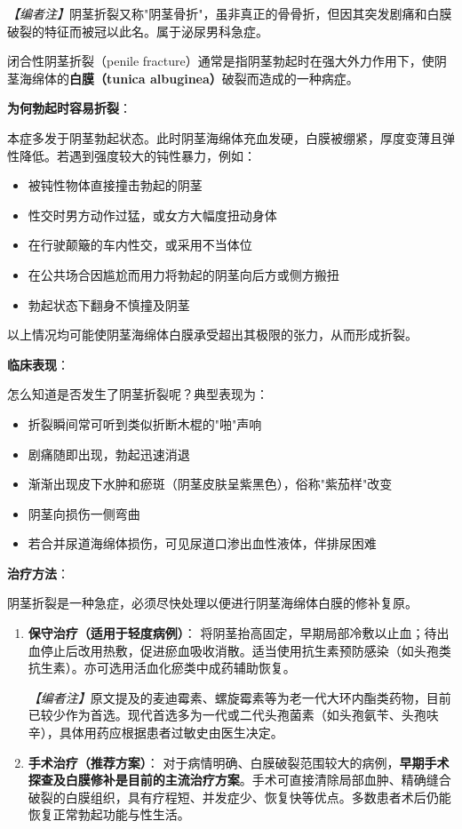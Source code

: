 \noindent\textit{【编者注】}阴茎折裂又称"阴茎骨折"，虽非真正的骨骨折，但因其突发剧痛和白膜破裂的特征而被冠以此名。属于泌尿男科急症。

\vspace{0.5em}
闭合性阴茎折裂（penile fracture）通常是指阴茎勃起时在强大外力作用下，使阴茎海绵体的\textbf{白膜（tunica albuginea）}破裂而造成的一种病症。

\vspace{0.5em}
\noindent\textbf{为何勃起时容易折裂}：

本症多发于阴茎勃起状态。此时阴茎海绵体充血发硬，白膜被绷紧，厚度变薄且弹性降低。若遇到强度较大的钝性暴力，例如：
\begin{itemize}
	\item 被钝性物体直接撞击勃起的阴茎
	\item 性交时男方动作过猛，或女方大幅度扭动身体
	\item 在行驶颠簸的车内性交，或采用不当体位
	\item 在公共场合因尴尬而用力将勃起的阴茎向后方或侧方搬扭
	\item 勃起状态下翻身不慎撞及阴茎
\end{itemize}
以上情况均可能使阴茎海绵体白膜承受超出其极限的张力，从而形成折裂。

\vspace{0.5em}
\noindent\textbf{临床表现}：

怎么知道是否发生了阴茎折裂呢？典型表现为：
\begin{itemize}
	\item 折裂瞬间常可听到类似折断木棍的"啪"声响
	\item 剧痛随即出现，勃起迅速消退
	\item 渐渐出现皮下水肿和瘀斑（阴茎皮肤呈紫黑色），俗称"紫茄样"改变
	\item 阴茎向损伤一侧弯曲
	\item 若合并尿道海绵体损伤，可见尿道口渗出血性液体，伴排尿困难
\end{itemize}

\vspace{0.5em}
\noindent\textbf{治疗方法}：

阴茎折裂是一种急症，必须尽快处理以便进行阴茎海绵体白膜的修补复原。

\begin{enumerate}
	\item \textbf{保守治疗（适用于轻度病例）}：
	将阴茎抬高固定，早期局部冷敷以止血；待出血停止后改用热敷，促进瘀血吸收消散。适当使用抗生素预防感染（如头孢类抗生素）。亦可选用活血化瘀类中成药辅助恢复。

	\noindent\textit{【编者注】}原文提及的麦迪霉素、螺旋霉素等为老一代大环内酯类药物，目前已较少作为首选。现代首选多为一代或二代头孢菌素（如头孢氨苄、头孢呋辛），具体用药应根据患者过敏史由医生决定。

	\item \textbf{手术治疗（推荐方案）}：
	对于病情明确、白膜破裂范围较大的病例，\textbf{早期手术探查及白膜修补是目前的主流治疗方案}。手术可直接清除局部血肿、精确缝合破裂的白膜组织，具有疗程短、并发症少、恢复快等优点。多数患者术后仍能恢复正常勃起功能与性生活。
\end{enumerate}

